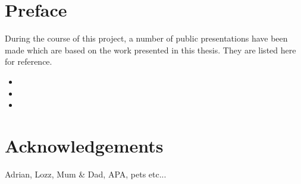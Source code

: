 
\chapter*{Preface} %
During the course of this project, a number of public presentations have been made which are based on the work
presented in this thesis. They are listed here for reference.
\nobibliography*
\begin{itemize}
\item {}
\item {}
\item {}
\end{itemize}


\chapter*{Acknowledgements} %

Adrian, Lozz, Mum \& Dad, APA, pets etc...

\singlespace    %
\tableofcontents

\newpage
{}









\appendix


\singlespace




